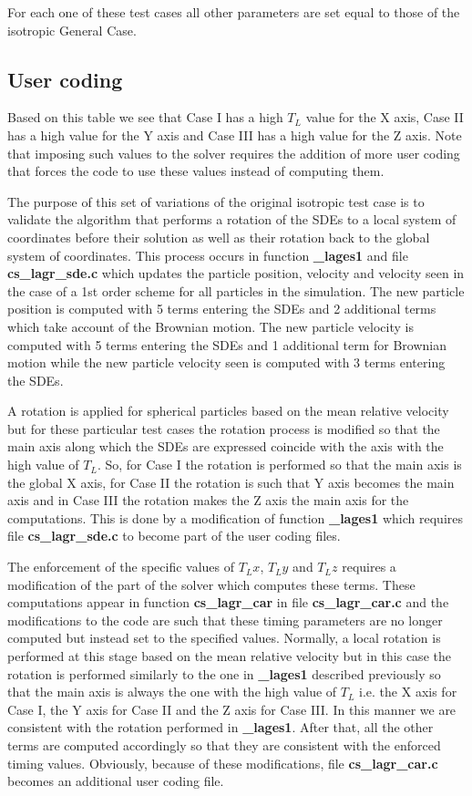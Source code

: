 For each one of these test cases all other parameters are set equal to those of the isotropic General Case.

\subsection{User coding}
Based on this table we see that Case I has a high $T_L$ value for the X axis, Case II has a high value for the Y axis and Case III has a high value for the Z axis. Note that imposing such values to the solver requires the addition of more user coding that forces the code to use these values instead of computing them.

The purpose of this set of variations of the original isotropic test case is to validate the algorithm that performs a rotation of the SDEs to a local system of coordinates before their solution as well as their rotation back to the global system of coordinates. This process occurs in function \textbf{\_lages1} and file \textbf{cs\_lagr\_sde.c} which updates the particle position, velocity and velocity seen in the case of a 1st order scheme for all particles in the simulation. The new particle position is computed with 5 terms entering the SDEs and 2 additional terms which take account of the Brownian motion. The new particle velocity is computed with 5 terms entering the SDEs and 1 additional term for Brownian motion while the new particle velocity seen is computed with 3 terms entering the SDEs.

A rotation is applied for spherical particles based on the mean relative velocity but for these particular test cases the rotation process is modified so that the main axis along which the SDEs are expressed coincide with the axis with the high value of $T_L$. So, for Case I the rotation is performed so that the main axis is the global X axis, for Case II the rotation is such that Y axis becomes the main axis and in Case III the rotation makes the Z axis the main axis for the computations. This is done by a modification of function \textbf{\_lages1} which requires file \textbf{cs\_lagr\_sde.c} to become part of the user coding files.

The enforcement of the specific values of $T_Lx$, $T_Ly$ and $T_Lz$ requires a modification of the part of the solver which computes these terms. These computations appear in function \textbf{cs\_lagr\_car} in file \textbf{cs\_lagr\_car.c} and the modifications to the code are such that these timing parameters are no longer computed but instead set to the specified values. Normally, a local rotation is performed at this stage based on the mean relative velocity but in this case the rotation is performed similarly to the one in \textbf{\_lages1} described previously so that the main axis is always the one with the high value of $T_L$ i.e. the X axis for Case I, the Y axis for Case II and the Z axis for Case III. In this manner we are consistent with the rotation performed in \textbf{\_lages1}. After that, all the other terms are computed accordingly so that they are consistent with the enforced timing values. Obviously, because of these modifications, file \textbf{cs\_lagr\_car.c} becomes an additional user coding file.


